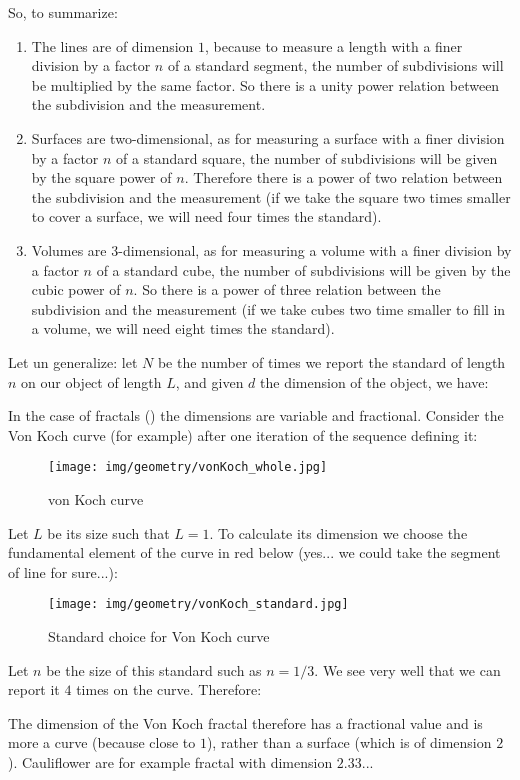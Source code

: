 	So, to summarize:
	\begin{enumerate}
		\item The lines are of dimension $1$, because to measure a length with a finer division by a factor $n$ of a standard segment, the number of subdivisions will be multiplied by the same factor. So there is a unity power relation between the subdivision and the measurement.
		
		\item Surfaces are two-dimensional, as for measuring a surface with a finer division by a factor $n$ of a standard square, the number of subdivisions will be given by the square power of $n$. Therefore there is a power of two relation between the subdivision and the measurement (if we take the square two times smaller to cover a surface, we will need four times the standard).
		
		\item Volumes are 3-dimensional, as for measuring a volume with a finer division by a factor $n$ of a standard cube, the number of subdivisions will be given by the cubic power of $n$. So there is a power of three relation between the subdivision and the measurement (if we take cubes two time smaller to fill in a volume, we will need eight times the standard).
	\end{enumerate}
	Let un generalize: let $N$ be the number of times we report the standard of length $n$ on our object of length $L$, and given $d$ the dimension of the object, we have:
	
	In the case of fractals () the dimensions are variable and fractional. Consider the Von Koch curve (for example) after one iteration of the sequence defining it:
	\begin{figure}[H]
		\centering
		\texttt{[image: img/geometry/vonKoch\_whole.jpg]}
		\caption{von Koch curve}
	\end{figure}
	Let $L$ be its size such that $L=1$. To calculate its dimension we choose the fundamental element of the curve in red below (yes... we could take the segment of line for sure...):
	\begin{figure}[H]
		\centering
		\texttt{[image: img/geometry/vonKoch\_standard.jpg]}
		\caption{Standard choice for Von Koch curve}
	\end{figure}
	Let $n$ be the size of this standard such as $n=1/3$. We see very well that we can report it $4$ times on the curve. Therefore:
	
	The dimension of the Von Koch fractal therefore has a fractional value and is more a curve (because close to $1$), rather than a surface (which is of dimension $2$). Cauliflower are for example fractal with dimension $2.33$...
	
